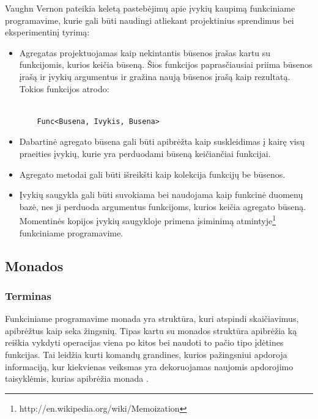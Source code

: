 Vaughn Vernon pateikia keletą pastebėjimų apie įvykių kaupimą funkciniame programavime, kurie gali būti naudingi atliekant projektinius sprendimus bei eksperimentinį tyrimą:

\begin{itemize}

	\item Agregatas projektuojamas kaip nekintantis būsenos įrašas kartu su funkcijomis, kurios keičia būseną. Šios funkcijos paprasčiausiai priima būsenos įrašą ir įvykių argumentus ir gražina naują būsenos įrašą kaip rezultatą. Tokios funkcijos atrodo:

\begin{lstlisting}

	Func<Busena, Ivykis, Busena>

\end{lstlisting}

	\item Dabartinė agregato būsena gali būti apibrėžta kaip suskleidimas į kairę visų praeities įvykių, kurie yra perduodami būseną keičiančiai funkcijai.

	\item Agregato metodai gali būti išreikšti kaip kolekcija funkcijų be būsenos.

	\item Įvykių saugykla gali būti suvokiama bei naudojama kaip funkcinė duomenų bazė, nes ji perduoda argumentus funkcijoms, kurios keičia agregato būseną. Momentinės kopijos įvykių saugykloje primena įsiminimą atmintyje\footnote{http://en.wikipedia.org/wiki/Memoization} funkciniame programavime.

\end{itemize}

\subsection{Monados}

\subsubsection{Terminas}

Funkciniame programavime monada yra struktūra, kuri atspindi skaičiavimus, apibrėžtus kaip seka žingsnių. Tipas kartu su monados struktūra apibrėžia ką reiškia vykdyti operacijas viena po kitos bei naudoti to pačio tipo įdėtines funkcijas. Tai leidžia kurti komandų grandines, kurios pažingsniui apdoroja informaciją, kur kiekvienas veiksmas yra dekoruojamas naujomis apdorojimo taisyklėmis, kurias apibrėžia monada \cite{OSullivan:2008:RWH:1523280}.


